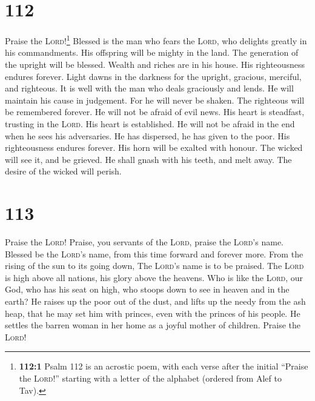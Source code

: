 \hypertarget{section-111}{%
\section{112}\label{section-111}}

 Praise the \textsc{Lord}!\footnote{\textbf{112:1} Psalm
  112 is an acrostic poem, with each verse after the initial ``Praise
  the \textsc{Lord}!'' starting with a letter of the alphabet (ordered
  from Alef to Tav).} Blessed is the man who fears the \textsc{Lord},
who delights greatly in his commandments.  His offspring
will be mighty in the land. The generation of the upright will be
blessed.  Wealth and riches are in his house. His
righteousness endures forever.  Light dawns in the
darkness for the upright, gracious, merciful, and righteous.
 It is well with the man who deals graciously and lends.
He will maintain his cause in judgement.  For he will
never be shaken. The righteous will be remembered forever.
 He will not be afraid of evil news. His heart is
steadfast, trusting in the \textsc{Lord}.  His heart is
established. He will not be afraid in the end when he sees his
adversaries.  He has dispersed, he has given to the poor.
His righteousness endures forever. His horn will be exalted with honour.
 The wicked will see it, and be grieved. He shall gnash
with his teeth, and melt away. The desire of the wicked will perish.

\hypertarget{section-112}{%
\section{113}\label{section-112}}

 Praise the \textsc{Lord}! Praise, you servants of the
\textsc{Lord}, praise the \textsc{Lord}'s name.  Blessed
be the \textsc{Lord}'s name, from this time forward and forever more.
 From the rising of the sun to its going down, The
\textsc{Lord}'s name is to be praised.  The \textsc{Lord}
is high above all nations, his glory above the heavens. 
Who is like the \textsc{Lord}, our God, who has his seat on high,
 who stoops down to see in heaven and in the earth?
 He raises up the poor out of the dust, and lifts up the
needy from the ash heap,  that he may set him with
princes, even with the princes of his people.  He settles
the barren woman in her home as a joyful mother of children. Praise the
\textsc{Lord}!

